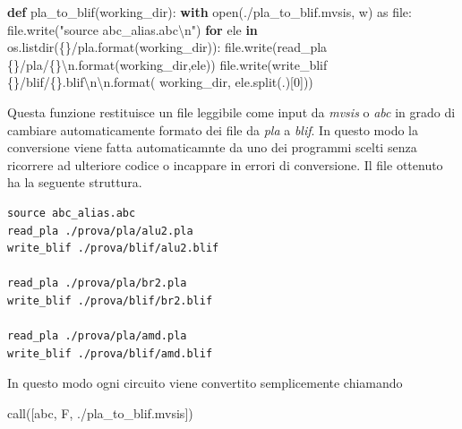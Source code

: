 \documentclass[
  italian,
]{book}
\newenvironment{Shaded}{\begin{snugshade}}{\end{snugshade}}
\newcommand{\BuiltInTok}[1]{#1}
\newcommand{\CharTok}[1]{\textcolor[rgb]{0.31,0.60,0.02}{#1}}
\newcommand{\ControlFlowTok}[1]{\textcolor[rgb]{0.13,0.29,0.53}{\textbf{#1}}}
\newcommand{\DecValTok}[1]{\textcolor[rgb]{0.00,0.00,0.81}{#1}}
\newcommand{\ImportTok}[1]{#1}
\newcommand{\KeywordTok}[1]{\textcolor[rgb]{0.13,0.29,0.53}{\textbf{#1}}}
\newcommand{\NormalTok}[1]{#1}
\newcommand{\SpecialCharTok}[1]{\textcolor[rgb]{0.00,0.00,0.00}{#1}}
\newcommand{\StringTok}[1]{\textcolor[rgb]{0.31,0.60,0.02}{#1}}
\begin{document}
\begin{Shaded}
\begin{Highlighting}[]
\KeywordTok{def}\NormalTok{ pla\_to\_blif(working\_dir):}
  \ControlFlowTok{with} \BuiltInTok{open}\NormalTok{(}\StringTok{\textquotesingle{}./pla\_to\_blif.mvsis\textquotesingle{}}\NormalTok{, }\StringTok{\textquotesingle{}w\textquotesingle{}}\NormalTok{) }\ImportTok{as} \BuiltInTok{file}\NormalTok{:}
    \BuiltInTok{file}\NormalTok{.write(}\StringTok{"source abc\_alias.abc}\CharTok{\textbackslash{}n}\StringTok{"}\NormalTok{)}
    \ControlFlowTok{for}\NormalTok{ ele }\KeywordTok{in}\NormalTok{ os.listdir(}\StringTok{\textquotesingle{}}\SpecialCharTok{\{\}}\StringTok{/pla\textquotesingle{}}\NormalTok{.}\BuiltInTok{format}\NormalTok{(working\_dir)):}
      \BuiltInTok{file}\NormalTok{.write(}\StringTok{\textquotesingle{}read\_pla }\SpecialCharTok{\{\}}\StringTok{/pla/}\SpecialCharTok{\{\}}\CharTok{\textbackslash{}n}\StringTok{\textquotesingle{}}\NormalTok{.}\BuiltInTok{format}\NormalTok{(working\_dir,ele))}
      \BuiltInTok{file}\NormalTok{.write(}\StringTok{\textquotesingle{}write\_blif }\SpecialCharTok{\{\}}\StringTok{/blif/}\SpecialCharTok{\{\}}\StringTok{.blif}\CharTok{\textbackslash{}n\textbackslash{}n}\StringTok{\textquotesingle{}}\NormalTok{.}\BuiltInTok{format}\NormalTok{(}
\NormalTok{        working\_dir, ele.split(}\StringTok{\textquotesingle{}.\textquotesingle{}}\NormalTok{)[}\DecValTok{0}\NormalTok{]))}
\end{Highlighting}
\end{Shaded}

Questa funzione restituisce un file leggibile come input da \emph{mvsis} o \emph{abc} in grado di cambiare automaticamente formato dei file da \emph{pla} a \emph{blif}. In questo modo la conversione viene fatta automaticamnte da uno dei programmi scelti senza ricorrere ad ulteriore codice o incappare in errori di conversione. Il file ottenuto ha la seguente struttura.

\begin{verbatim}
source abc_alias.abc
read_pla ./prova/pla/alu2.pla
write_blif ./prova/blif/alu2.blif

read_pla ./prova/pla/br2.pla
write_blif ./prova/blif/br2.blif

read_pla ./prova/pla/amd.pla
write_blif ./prova/blif/amd.blif
\end{verbatim}

In questo modo ogni circuito viene convertito semplicemente chiamando

\begin{Shaded}
\begin{Highlighting}[]
\NormalTok{call([}\StringTok{\textquotesingle{}abc\textquotesingle{}}\NormalTok{, }\StringTok{\textquotesingle{}{-}F\textquotesingle{}}\NormalTok{, }\StringTok{\textquotesingle{}./pla\_to\_blif.mvsis\textquotesingle{}}\NormalTok{])}
\end{Highlighting}
\end{Shaded}
\end{document}
